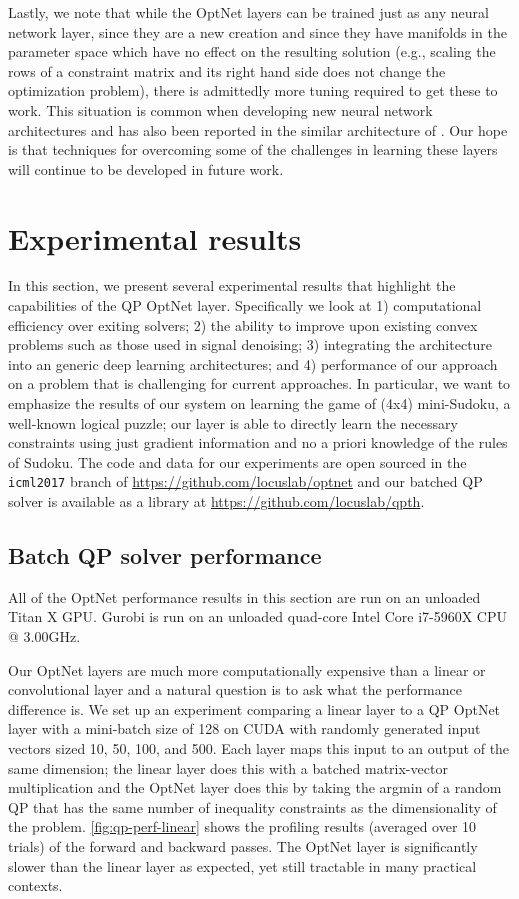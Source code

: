 Lastly, we note that while the OptNet layers can be trained just as any neural
network layer, since they are a new creation and since they have manifolds in
the parameter space which have no effect on the resulting solution (e.g.,
scaling the rows of a constraint matrix and its right hand side does not change
the optimization problem), there is admittedly more tuning required to get these
to work.
This situation is common when developing new neural
network architectures and has also been reported in the
similar architecture of \citet{schmidt2014shrinkage}.
Our hope is that techniques for overcoming some of the challenges
in learning these layers will continue to be developed in future work.

\section{Experimental results}
\label{sec:icnn:exp}

In this section, we present several experimental results that highlight the
capabilities of the QP OptNet layer.
Specifically we look at
1) computational efficiency over exiting solvers;
2) the ability to improve upon existing convex problems such as those used
in signal denoising;
3) integrating the architecture into an generic deep learning architectures;
and 4) performance of our approach on a problem that is challenging for current approaches.
In particular, we want to emphasize the results of our system on learning
the game of (4x4) mini-Sudoku, a well-known logical puzzle;
our layer is able to directly learn the necessary constraints
using just gradient information and no a priori knowledge
of the rules of Sudoku.
The code and data for our experiments are open sourced in the
\verb!icml2017! branch of \url{https://github.com/locuslab/optnet}
and our batched QP solver is available as a library at
\url{https://github.com/locuslab/qpth}.

\subsection{Batch QP solver performance}
\label{sec:optnet:qp-timing}

All of the OptNet performance results in this section are run on
an unloaded Titan X GPU. Gurobi is run on an unloaded quad-core
Intel Core i7-5960X CPU @ 3.00GHz.

Our OptNet layers are much more computationally expensive than
a linear or convolutional layer and a natural question is to ask
what the performance difference is.
We set up an experiment comparing a linear layer to a QP OptNet layer
with a mini-batch size of 128 on CUDA with
randomly generated input vectors sized 10, 50, 100, and 500.
Each layer maps this input to an output of the same dimension;
the linear layer does this with a batched matrix-vector multiplication
and the OptNet layer does this by taking the argmin of a random QP that
has the same number of inequality constraints as the dimensionality
of the problem.
\cref{fig:qp-perf-linear} shows the profiling results
(averaged over 10 trials) of the forward and backward passes.
The OptNet layer is significantly slower than the linear layer
as expected, yet still tractable in many practical contexts.

